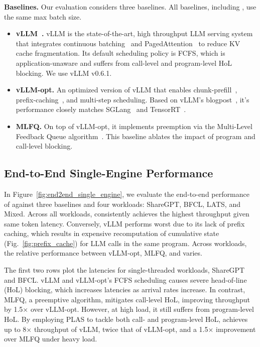 \vspace{1mm}
\noindent \textbf{Baselines.} Our evaluation considers three baselines. All baselines, including \text{\name}, use the same max batch size.
\begin{itemize}[itemsep=0pt, parsep=0pt, topsep=0pt, partopsep=0pt, leftmargin=*]
    \item \textbf{vLLM~\cite{vllm}.} vLLM is the state-of-the-art, high throughput LLM serving system that integrates continuous batching~\cite{orca} and PagedAttention~\cite{vllm} to reduce KV cache fragmentation. Its default scheduling policy is FCFS, which is application-unaware and suffers from call-level and program-level HoL blocking. We use vLLM v0.6.1.
    \item \textbf{vLLM-opt.} An optimized version of vLLM that enables chunk-prefill~\cite{chunk_prefill}, prefix-caching~\cite{zheng2024sglangefficientexecutionstructured, lin2024parrotefficientservingllmbased}, and multi-step scheduling. Based on vLLM's blogpost~\cite{vllm2024perfupdate}, it's performance closely matches SGLang~\cite{zheng2024sglangefficientexecutionstructured} and TensorRT~\cite{NVIDIATensorRT-LLM}.
    \item \textbf{MLFQ.} On top of vLLM-opt, it implements preemption via the Multi-Level Feedback Queue algorithm~\cite{fastserve}. This baseline ablates the impact of program and call-level blocking.
\end{itemize}

\subsection{End-to-End Single-Engine Performance}
In Figure~\ref{fig:end2end_single_engine}, we evaluate the end-to-end performance of \text{\name} against three baselines and four workloads: ShareGPT, BFCL, LATS, and Mixed. Across all workloads, \text{\name} consistently achieves the highest throughput given same token latency. Conversely, vLLM performs worst due to its lack of prefix caching, which results in expensive recomputation of cumulative state (Fig.~\ref{fig:prefix_cache}) for LLM calls in the same program. Across workloads, the relative performance between vLLM-opt, MLFQ, and \text{\name} varies.

The first two rows plot the latencies for single-threaded workloads, ShareGPT and BFCL. vLLM and vLLM-opt’s FCFS scheduling causes severe head-of-line (HoL) blocking, which increases latencies as arrival rates increase. In contrast, MLFQ, a preemptive algorithm, mitigates call-level HoL, improving throughput by 1.5× over vLLM-opt. However, at high load, it still suffers from program-level HoL. By employing PLAS to tackle both call- and program-level HoL, \text{\name} achieves up to 8× throughput of vLLM, twice that of vLLM-opt, and a 1.5× improvement over MLFQ under heavy load.

